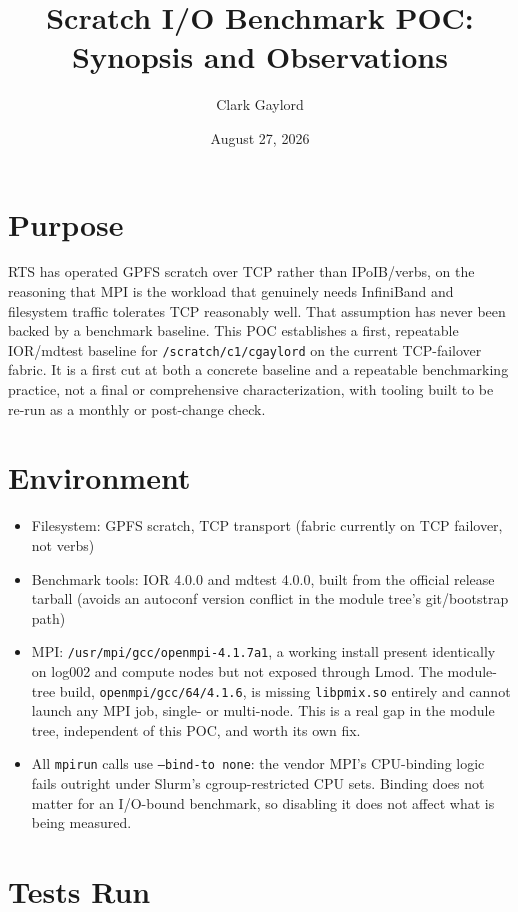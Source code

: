\documentclass[11pt]{article}
\title{Scratch I/O Benchmark POC: Synopsis and Observations}
\author{Clark Gaylord}
\date{August 27, 2026}
\begin{document}
\maketitle

\section*{Purpose}

RTS has operated GPFS scratch over TCP rather than IPoIB/verbs, on the reasoning that MPI is the workload that genuinely needs InfiniBand and filesystem traffic tolerates TCP reasonably well. That assumption has never been backed by a benchmark baseline. This POC establishes a first, repeatable IOR/mdtest baseline for \texttt{/scratch/c1/cgaylord} on the current TCP-failover fabric. It is a first cut at both a concrete baseline and a repeatable benchmarking practice, not a final or comprehensive characterization, with tooling built to be re-run as a monthly or post-change check.

\section*{Environment}

\begin{itemize}
\item Filesystem: GPFS scratch, TCP transport (fabric currently on TCP failover, not verbs)
\item Benchmark tools: IOR 4.0.0 and mdtest 4.0.0, built from the official release tarball (avoids an autoconf version conflict in the module tree's git/bootstrap path)
\item MPI: \texttt{/usr/mpi/gcc/openmpi-4.1.7a1}, a working install present identically on log002 and compute nodes but not exposed through Lmod. The module-tree build, \texttt{openmpi/gcc/64/4.1.6}, is missing \texttt{libpmix.so} entirely and cannot launch any MPI job, single- or multi-node. This is a real gap in the module tree, independent of this POC, and worth its own fix.
\item All \texttt{mpirun} calls use \texttt{--bind-to none}: the vendor MPI's CPU-binding logic fails outright under Slurm's cgroup-restricted CPU sets. Binding does not matter for an I/O-bound benchmark, so disabling it does not affect what is being measured.
\end{itemize}

\section*{Tests Run}
\end{document}
